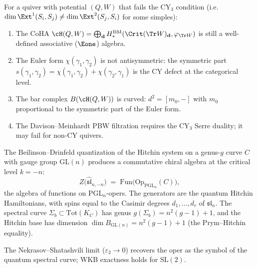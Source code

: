 \begin{proposition}
\label{prop:coha-non-cy}
For a quiver with potential $(Q, W)$ that fails the CY$_3$ condition
(i.e.\ $\dim \Ext^1(S_i, S_j) \neq \dim \Ext^2(S_j, S_i)$ for some simples):
\begin{enumerate}[label=\textup{(\roman*)}]
 \item The CoHA $\cH(Q, W) = \bigoplus_{\mathbf{d}} H^{\mathrm{BM}}_*(\Crit(\Tr W)_{\mathbf{d}}, \varphi_{\Tr W})$ is still a well-defined associative ($\Eone$) algebra.
 \item The Euler form $\chi(\gamma_1, \gamma_2)$ is not antisymmetric: the symmetric part $s(\gamma_1, \gamma_2) = \chi(\gamma_1, \gamma_2) + \chi(\gamma_2, \gamma_1)$ is the CY defect at the categorical level.
 \item The bar complex $B(\cH(Q,W))$ is curved: $d^2 = [m_0, -]$ with $m_0$ proportional to the symmetric part of the Euler form.
 \item The Davison--Meinhardt PBW filtration requires the CY$_3$ Serre duality; it may fail for non-CY quivers.
\end{enumerate}
\end{proposition}


\begin{proposition}
\label{prop:spectral-curve-chiral}
The Beilinson--Drinfeld quantization of the Hitchin system on a genus-$g$ curve $C$ with gauge group $\mathrm{GL}(n)$ produces a commutative chiral algebra at the critical level $k = -n$:
\[
 Z\bigl(\widehat{\mathfrak{sl}}_{n, -n}\bigr) \;=\; \mathrm{Fun}\bigl(\mathrm{Op}_{\mathrm{PGL}_n}(C)\bigr),
\]
the algebra of functions on $\mathrm{PGL}_n$-opers. The generators are the quantum Hitchin Hamiltonians, with spins equal to the Casimir degrees $d_1, \ldots, d_r$ of $\mathfrak{sl}_n$. The spectral curve $\Sigma_b \subset \mathrm{Tot}(K_C)$ has genus $g(\Sigma_b) = n^2(g-1) + 1$, and the Hitchin base has dimension $\dim B_{\mathrm{GL}(n)} = n^2(g-1) + 1$ (the Prym--Hitchin equality).

The Nekrasov--Shatashvili limit ($\varepsilon_2 \to 0$) recovers the oper as the symbol of the quantum spectral curve; WKB exactness holds for $\mathrm{SL}(2)$.
\end{proposition}



